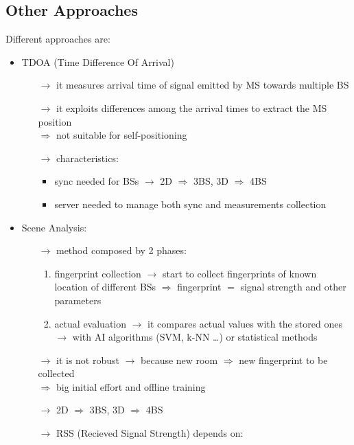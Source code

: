 \subsection{Other Approaches}
Different approaches are:
\begin{itemize}
    \item TDOA (Time Difference Of Arrival)
    \begin{itemize}
        \item[$\rightarrow$] it measures arrival time of signal emitted by MS towards multiple BS
        \item[$\rightarrow$] it exploits differences among the arrival times to extract the MS position\\
        $\Rightarrow$ not suitable for self-positioning
        \item[$\rightarrow$] characteristics:
        \begin{itemize}
            \item sync needed for BSs $\rightarrow$ 2D $\Rightarrow$ 3BS, 3D $\Rightarrow$ 4BS
            \item server needed to manage both sync and measurements collection
        \end{itemize} 
    \end{itemize}
    \item Scene Analysis:
    \begin{itemize}
        \item[$\rightarrow$] method composed by 2 phases:
        \begin{enumerate} 
            \item fingerprint collection $\rightarrow$ start to collect fingerprints of known location of
            different BSs $\Rightarrow$ fingerprint $=$ signal strength and other parameters
            \item actual evaluation $\rightarrow$ it compares actual values with the stored ones\\
            $\rightarrow$ with AI algorithms (SVM, k-NN \dots) or statistical methods
        \end{enumerate}
        \item[$\rightarrow$] it is not robust $\rightarrow$ because new room $\Rightarrow$ new fingerprint to be collected\\
        $\Rightarrow$ big initial effort and offline training
        \item[$\rightarrow$] 2D $\Rightarrow$ 3BS, 3D $\Rightarrow$ 4BS
        \item[$\rightarrow$] RSS (Recieved Signal Strength) depends on:

\end{itemize}
\end{itemize}
